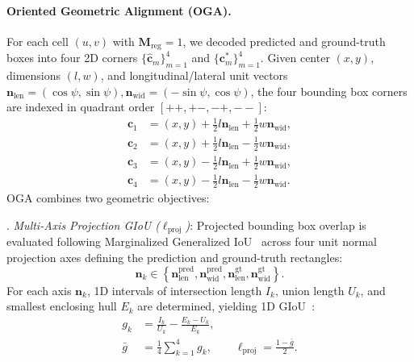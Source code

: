 \paragraph{Oriented Geometric Alignment (OGA).}
For each cell $(u, v)$ with $\mathbf{M}_{\mathrm{reg}} = 1$, we decoded predicted and ground-truth boxes into four 2D corners $\{\widehat{\mathbf{c}}_m\}_{m=1}^4$ and $\{\mathbf{c}_m^*\}_{m=1}^4$. Given center $(x, y)$, dimensions $(l, w)$, and longitudinal/lateral unit vectors $\mathbf{n}_{\mathrm{len}} = (\cos\psi, \sin\psi), \mathbf{n}_{\mathrm{wid}} = (-\sin\psi, \cos\psi)$, the four bounding box corners are indexed in quadrant order $[++, +-, -+, --]$:
\begin{equation}
    \begin{aligned}
        \mathbf{c}_1 &= (x, y) + \tfrac{1}{2}l\mathbf{n}_{\mathrm{len}} + \tfrac{1}{2}w\mathbf{n}_{\mathrm{wid}}, \\
        \mathbf{c}_2 &= (x, y) + \tfrac{1}{2}l\mathbf{n}_{\mathrm{len}} - \tfrac{1}{2}w\mathbf{n}_{\mathrm{wid}}, \\
        \mathbf{c}_3 &= (x, y) - \tfrac{1}{2}l\mathbf{n}_{\mathrm{len}} + \tfrac{1}{2}w\mathbf{n}_{\mathrm{wid}}, \\
        \mathbf{c}_4 &= (x, y) - \tfrac{1}{2}l\mathbf{n}_{\mathrm{len}} - \tfrac{1}{2}w\mathbf{n}_{\mathrm{wid}}.
    \end{aligned}
    \label{eq:corner_enumeration}
\end{equation}
OGA combines two geometric objectives:
\par{}. \textit{Multi-Axis Projection GIoU ($\ell_{\mathrm{proj}}$)}: Projected bounding box overlap is evaluated following Marginalized Generalized IoU~\cite{le2026mgiou} across four unit normal projection axes defining the prediction and ground-truth rectangles:
\begin{equation}
    \mathbf{n}_k \in \left\{ \mathbf{n}_{\mathrm{len}}^{\mathrm{pred}}, \mathbf{n}_{\mathrm{wid}}^{\mathrm{pred}}, \mathbf{n}_{\mathrm{len}}^{\mathrm{gt}}, \mathbf{n}_{\mathrm{wid}}^{\mathrm{gt}} \right\}.
    \label{eq:projection_axes}
\end{equation}
For each axis $\mathbf{n}_k$, 1D intervals of intersection length $I_k$, union length $U_k$, and smallest enclosing hull $E_k$ are determined, yielding 1D GIoU~\cite{rezatofighi2019giou}:
\begin{equation}
    \begin{aligned}
        g_k &= \frac{I_k}{U_k} - \frac{E_k - U_k}{E_k}, \\
        \bar{g} &= \frac{1}{4}\sum_{k=1}^4 g_k, \qquad
        \ell_{\mathrm{proj}} = \frac{1 - \bar{g}}{2}.
    \end{aligned}
    \label{eq:mgiou_loss}
\end{equation}
